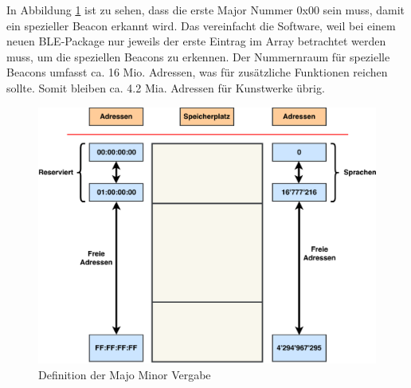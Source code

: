 In Abbildung \ref{fig:Bluetooth_MM_Vergabe} ist zu sehen, dass die erste Major Nummer 0x00 sein muss, damit ein spezieller Beacon erkannt wird. Das vereinfacht die Software, weil bei einem neuen BLE-Package nur jeweils der erste Eintrag im Array betrachtet werden muss, um die speziellen Beacons zu erkennen. Der Nummernraum für spezielle Beacons umfasst ca. 16 Mio. Adressen, was für zusätzliche Funktionen reichen sollte. Somit bleiben ca. 4.2 Mia. Adressen für Kunstwerke übrig.

\begin{figure}[htbp!!!!]
	\centering
	\includegraphics[width=1.0\textwidth]{Data/Speicheradressen_picture}
	\caption[Software:MM Vergabe]{Definition der Majo Minor Vergabe}
	\label{fig:Bluetooth_MM_Vergabe}
\end{figure}


